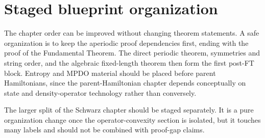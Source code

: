 \documentclass{article}
\begin{document}
\section{Staged blueprint organization}

The chapter order can be improved without changing theorem statements. A safe
organization is to keep the aperiodic proof dependencies first, ending with the
proof of the Fundamental Theorem. The direct periodic theorem, symmetries and
string order, and the algebraic fixed-length theorem then form the first
post-FT block. Entropy and MPDO material should be placed before parent
Hamiltonians, since the parent-Hamiltonian chapter depends conceptually on
state and density-operator technology rather than conversely.

The larger split of the Schwarz chapter should be staged separately. It is a
pure organization change once the operator-convexity section is isolated, but it
touches many labels and should not be combined with proof-gap claims.



\end{document}
